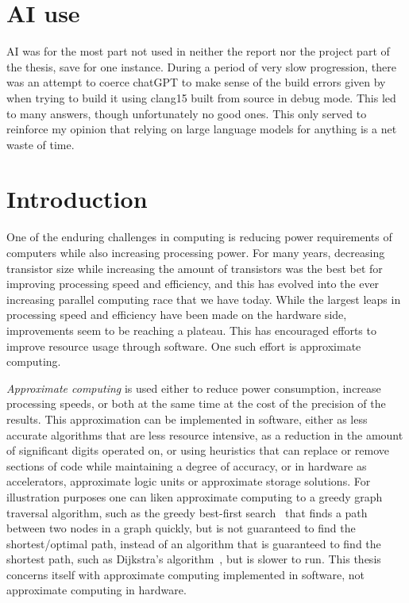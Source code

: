 \section*{AI use}
AI was for the most part not used in neither the report nor the project part of the thesis, save for one instance. During a period of very slow progression, there was an attempt to coerce chatGPT to make sense of the build errors given by \taffo{} when trying to build it using clang15 built from source in debug mode. This led to many answers, though unfortunately no good ones. This only served to reinforce my opinion that relying on large language models for anything is a net waste of time. 


\section{Introduction}

One of the enduring challenges in computing is reducing power requirements of computers while also increasing processing power. For many years, decreasing transistor size while increasing the amount of transistors was the best bet for improving processing speed and efficiency, and this has evolved into the ever increasing parallel computing race that we have today. While the largest leaps in processing speed and efficiency have been made on the hardware side, improvements seem to be reaching a plateau. This has encouraged efforts to improve resource usage through software. One such effort is approximate computing. 

\emph{Approximate computing} is used either to reduce power consumption, increase processing speeds, or both at the same time at the cost of the precision of the results. This approximation can be implemented in software, either as less accurate algorithms that are less resource intensive, as a reduction in the amount of significant digits operated on, or using heuristics that can replace or remove sections of code while maintaining a degree of accuracy, or in hardware as accelerators, approximate logic units or approximate storage solutions. For illustration purposes one can liken approximate computing to a greedy graph traversal algorithm, such as the greedy best-first search~\citep{coles2007marvin} that finds a path between two nodes in a graph quickly, but is not guaranteed to find the shortest/optimal path, instead of an algorithm that is guaranteed to find the shortest path, such as Dijkstra's algorithm~\citep{dijkstra1959note}, but is slower to run. This thesis concerns itself with approximate computing implemented in software, not approximate computing in hardware. 

